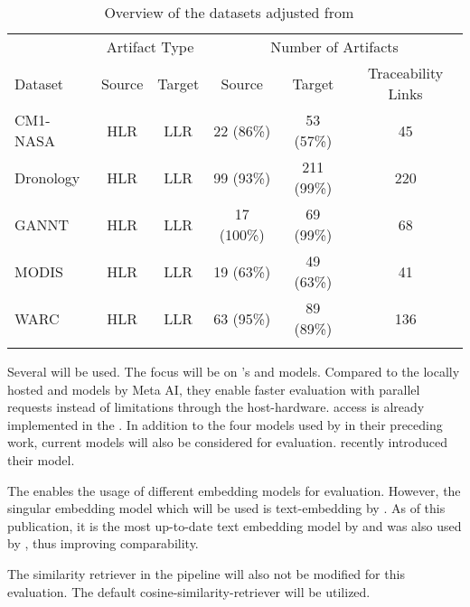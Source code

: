 \begin{table}[]
    \centering
    \begin{tabular}{lccccc}
        & \multicolumn{2}{c}{Artifact Type} & \multicolumn{3}{c}{Number of Artifacts} \\
        \cmidrule(lr){ 2-3 } \cmidrule(lr){ 4-6 }
        Dataset   & Source & Target & Source     & Target     & Traceability Links \\
        \arrayrulecolor{kit-gray30} \midrule \arrayrulecolor{black}
        CM1-NASA  & HLR    & LLR    & 22 (86\%)  & 53 (57\%)  & 45   \\
        Dronology & HLR    & LLR    & 99 (93\%)  & 211 (99\%) & 220  \\
        GANNT     & HLR    & LLR    & 17 (100\%) & 69 (99\%)  & 68   \\
        MODIS     & HLR    & LLR    & 19 (63\%)  & 49 (63\%)  & 41   \\
        WARC      & HLR    & LLR    & 63 (95\%)  & 89 (89\%)  & 136  \\
        \arrayrulecolor{kit-gray30} \midrule \arrayrulecolor{black}
    \end{tabular}
    \caption{Overview of the datasets adjusted from \citeauthor{hey2025RequirementsTraceability}~\cite[Table 1]{hey2025RequirementsTraceability}}
    \label{tab:dataset_overview}
\end{table}


Several \LLMs will be used.
The focus will be on \OAI's \gpt and \gptmini models.
Compared to the locally hosted \codellama and \llama models by Meta AI, they enable faster evaluation with parallel requests instead of limitations through the host-hardware.
\API access is already implemented in the \LiSSAf.
In addition to the four models used by  in their preceding work, current models will also be considered for evaluation.
\OAI recently introduced their \gptf model.

The \LiSSAf enables the usage of different embedding models for evaluation.
However, the singular embedding model which will be used is \ac{text-embedding} by \OAI.
As of this publication, it is the most up-to-date text embedding model by \OAI and was also used by \citeauthor{hey2025RequirementsTraceability}, thus improving comparability.

The similarity retriever in the \LiSSA pipeline will also not be modified for this evaluation.
The default cosine-similarity-retriever will be utilized.

